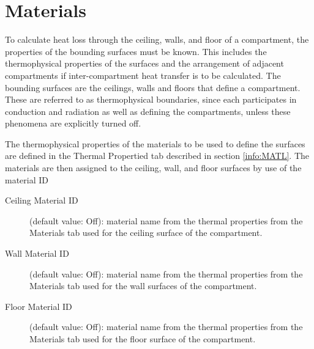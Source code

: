 \section{Materials}
\label{info:COMP2}
To calculate heat loss through the ceiling, walls, and floor of a compartment, the properties of the bounding surfaces must be known. This includes the thermophysical properties of the surfaces and the arrangement of adjacent compartments if inter-compartment heat transfer is to be calculated.
The bounding surfaces are the ceilings, walls and floors that define a compartment. These are referred to as thermophysical boundaries, since each participates in conduction and radiation as well as defining the compartments, unless these phenomena are explicitly turned off.

The thermophysical properties of the materials to be used to define the surfaces are defined in the Thermal Propertied tab described in section \ref{info:MATL}. The materials are then assigned to the ceiling, wall, and floor surfaces by use of the material ID

\begin{description}
\item[Ceiling Material ID] (default value: Off): material name from the thermal properties from the Materials tab used for the ceiling surface of the compartment.

\item[Wall Material ID] (default value: Off): material name from the thermal properties from the Materials tab used for the wall surfaces of the compartment.

\item[Floor Material ID] (default value: Off): material name from the thermal properties from the Materials tab used for the floor surface of the compartment.
\end{description}





